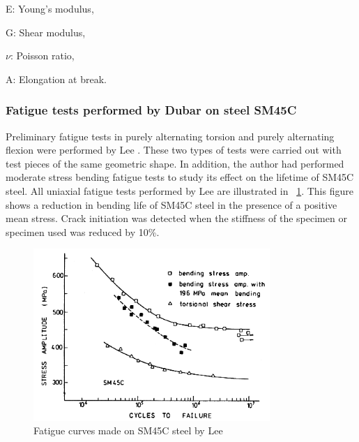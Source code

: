 \documentclass[3p,times,number,review]{elsarticle}
\newcommand{\figref}[1]{\figurename~\ref{#1}}
\begin{document}
\begin{flushleft}
	E: Young's modulus,
	
	G: Shear modulus,
	
	$\nu$: Poisson ratio,
	
	A:	Elongation at break.
\end{flushleft}
\newpage
\subsubsection{Fatigue tests performed by Dubar on steel SM45C}
Preliminary fatigue tests in purely alternating torsion and purely alternating flexion were performed by Lee \cite{lee2013out}. These two types of tests were carried out with test pieces of the same geometric shape. In addition, the author had performed moderate stress bending fatigue tests to study its effect on the lifetime of SM45C steel. All uniaxial fatigue tests performed by Lee \cite{lee2013out} are illustrated in \figref{fig.SM45CSN}. This figure shows a reduction in bending life of SM45C steel in the presence of a positive mean stress. Crack initiation was detected when the stiffness of the specimen or specimen used was reduced by 10\%.
\begin{figure}[!h]
	\centering
	\includegraphics[width=0.8\textwidth]{figures//SM45C_SN.png} 
	\caption{Fatigue curves made on SM45C steel by Lee \cite{lee2013out}}
	\label{fig.SM45CSN}
\end{figure}
\end{document}
